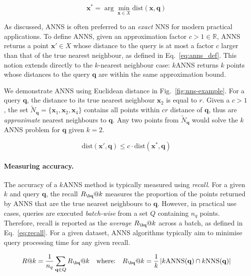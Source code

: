 \documentclass{article}
\newcommand{\Real}{\mathbb{R}}
\newcommand{\bx}{\mathbf{x}}
\newcommand{\bxs}{\mathbf{x}^*}
\newcommand{\bq}{\mathbf{q}}
\newcommand{\dist}{\mathrm{dist}}
\newcommand{\tNq}{\widetilde{N}_\bq}
\begin{document}
\begin{equation}
\bxs = \arg\min_{\bx \in X} \dist(\bx, \bq)
\label{eq:nns_def}
\end{equation}

As discussed, ANNS is often preferred to an \textit{exact} NNS for modern practical applications. To define ANNS, given an approximation factor $c > 1 \in \Real$, ANNS returns a point $\bx' \in X$ whose distance to the query is at most a factor $c$ larger than that of the true nearest neighbour, as defined in Eq.~\ref{eq:anns_def}. This notion extends directly to the $k$-nearest neighbour case: $k$ANNS returns $k$ points whose distances to the query $\bq$ are within the same approximation bound. 

We demonstrate ANNS using Euclidean distance in Fig.~\ref{fig:nns-example}. For a query $\bq$, the distance to its true nearest neighbour $\bx_2$ is equal to $r$. Given a $c > 1$, the set $\tNq =  \{\bx_1, \bx_2, \bx_4\}$ contains all points within $cr$ distance of $\bq$, thus are \emph{approximate} nearest neighbours to $\bq$. Any two points from $\tNq$ would solve the $k$ANNS problem for $\bq$ given $k=2$. 

\begin{equation}
\dist(\bx', \bq) \leq c \cdot \dist(\bxs, \bq)
\label{eq:anns_def}
\end{equation}

\paragraph{Measuring accuracy.} The accuracy of a $k$ANNS method is typically measured using \emph{recall}. For a given $k$ and query $\bq$, the recall $R_\bq@k$ measures the proportion of the points returned by ANNS that are the true nearest neighbours to $\bq$. However, in practical use cases, queries are executed \emph{batch-wise} from a set $Q$ containing $n_q$ points. Therefore, recall is reported as the \emph{average} $R_\bq@k$ across a batch, as defined in Eq.~\ref{eq:recall}. For a given dataset, ANNS algorithms typically aim to minimise query processing time for any given recall.

\begin{equation}
    \label{eq:recall}
    \begin{aligned}
    R@k = \frac{1}{n_q}\sum_{\bq \in Q} R_\bq@k
    \quad \text{where:} \quad
    R_\bq@k = \frac{1}{k}\left| k\text{ANNS}(\bq) \cap k\text{NNS}(\bq) \right| 
    \end{aligned}
\end{equation}
\end{document}
